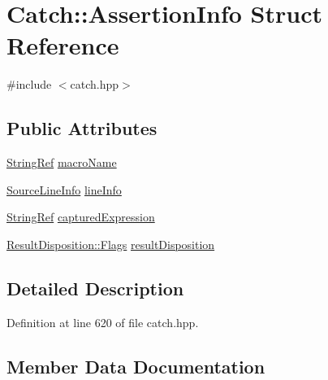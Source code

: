 \hypertarget{struct_catch_1_1_assertion_info}{}\section{Catch\+:\+:Assertion\+Info Struct Reference}
\label{struct_catch_1_1_assertion_info}


{\ttfamily \#include $<$catch.\+hpp$>$}

\subsection*{Public Attributes}
\begin{DoxyCompactItemize}
\item 
\mbox{\hyperlink{class_catch_1_1_string_ref}{String\+Ref}} \mbox{\hyperlink{struct_catch_1_1_assertion_info_aaf3fbb9f1fe09c879ba3d877584e3056}{macro\+Name}}
\item 
\mbox{\hyperlink{struct_catch_1_1_source_line_info}{Source\+Line\+Info}} \mbox{\hyperlink{struct_catch_1_1_assertion_info_a17bdbb404ba12658034f833be2f4c3e7}{line\+Info}}
\item 
\mbox{\hyperlink{class_catch_1_1_string_ref}{String\+Ref}} \mbox{\hyperlink{struct_catch_1_1_assertion_info_accd36744b4acaa3a691a72df0b42190f}{captured\+Expression}}
\item 
\mbox{\hyperlink{struct_catch_1_1_result_disposition_a3396cad6e2259af326b3aae93e23e9d8}{Result\+Disposition\+::\+Flags}} \mbox{\hyperlink{struct_catch_1_1_assertion_info_a60353b3632ab2f827162f2b2d6911073}{result\+Disposition}}
\end{DoxyCompactItemize}


\subsection{Detailed Description}


Definition at line 620 of file catch.\+hpp.



\subsection{Member Data Documentation}
\mbox{\label{struct_catch_1_1_assertion_info_accd36744b4acaa3a691a72df0b42190f}} 
